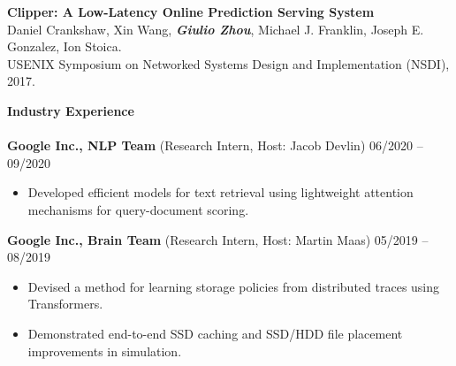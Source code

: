 \documentclass{article}
\begin{document}
\noindent
\textbf{Clipper: A Low-Latency Online Prediction Serving System} \\
\indent
\hspace{-4.5mm}
{\small Daniel Crankshaw, Xin Wang, \textit{\textbf{Giulio Zhou}}, Michael J. Franklin, Joseph E. Gonzalez, Ion Stoica.} \\
\indent
\hspace{-4.5mm}
{\small USENIX Symposium on Networked Systems Design and Implementation (NSDI), 2017.} \\
\vspace{1mm}

% 

\noindent
\textbf{{\Large Industry Experience}}\\[-2mm]
\HRule\\
\textbf{Google Inc., NLP Team} (Research Intern, Host: Jacob Devlin)
\hfill 06/2020 -- 09/2020\\
\begin{itemize}
\vspace{-6.5mm}
\item Developed efficient models for text retrieval using lightweight attention mechanisms for query-document scoring.
\end{itemize}
\vspace{-1mm}

\noindent
\textbf{Google Inc., Brain Team} (Research Intern, Host: Martin Maas)
\hfill 05/2019 -- 08/2019\\
\begin{itemize}
\vspace{-6.5mm}
\item Devised a method for learning storage policies from distributed traces using Transformers.
\vspace{-2.5mm}
\item Demonstrated end-to-end SSD caching and SSD/HDD file placement improvements in simulation.
\end{itemize}
\vspace{-1mm}
\end{document}
